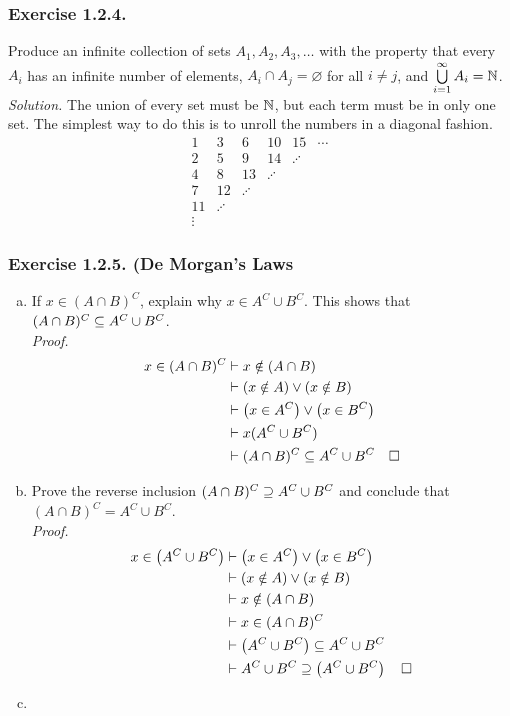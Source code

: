 \documentclass[../Exercises.tex]{subfiles}
\begin{document}
		\subsubsection*{Exercise 1.2.4.}
			Produce an infinite collection of sets $A_1, A_2, A_3, \ldots$ with the property that every $A_i$ has an infinite number of elements, $A_i \cap A_j = \varnothing$ for all $i \ne j$, and $\bigcup\limits_{i = 1}^\infty A_i = \mathbb{N}$. \\
			\emph{Solution.}
				The union of every set must be $\mathbb{N}$, but each term must be in only one set. The simplest way to do this is to unroll the numbers in a diagonal fashion.
					\[\begin{array}{cccccc}
						1 & 3 & 6 & 10 & 15 & \cdots \\
						2 & 5 & 9 & 14 & \iddots \\
						4 & 8 & 13 & \iddots \\
						7 & 12 & \iddots \\
						11 & \iddots \\
						\vdots
					\end{array}\]
		\subsubsection*{Exercise 1.2.5. (De Morgan's Laws}
			\begin{enumerate}[(a)]
				\item
					If $x \in (A \cap B)^C$, explain why $x \in A^C \cup B^C$. This shows that $(A \cap B)^C \subseteq A^C \cup B^C$. \\
					\emph{Proof.}
						\begin{align*}
							x \in (A \cap B)^C &\vdash x \notin (A \cap B) \\
								&\vdash (x \notin A) \lor (x \notin B) \\
								&\vdash \left(x \in A^C \right) \lor \left(x \in B^C \right) \\
								&\vdash x (A^C \cup B^C) \\
								&\vdash (A \cap B)^C \subseteq A^C \cup B^C\quad \Box
						\end{align*}
				\item
					Prove the reverse inclusion $(A \cap B)^C \supseteq A^C \cup B^C$ and conclude that $(A \cap B)^C = A^C \cup B^C$. \\
					\emph{Proof.}
						\begin{align*}
							x \in \left(A^C \cup B^C\right) &\vdash \left(x \in A^C\right) \lor \left(x \in B^C\right) \\
								&\vdash (x \notin A) \lor (x \notin B) \\
								&\vdash x \notin (A \cap B) \\
								&\vdash x \in (A \cap B)^C \\
								&\vdash \left(A^C \cup B^C\right) \subseteq A^C \cup B^C \\
								&\vdash A^C \cup B^C \supseteq \left(A^C \cup B^C\right) \quad \Box
						\end{align*}
				\item
			\end{enumerate}
\end{document}
